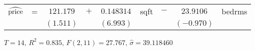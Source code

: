 \begin{tabular}{rcccc@{\,}lcc@{\,}l}
$\widehat{\rm price}$ & = &
$121.179$& $+$ & $0.148314$ & sqft & $-$ & $23.9106$ & bedrms \\
& & $(1.511)$ & & $(6.993)$ & & & $(-0.970)$ 
\end{tabular}

\vspace{8pt}
$T = 14,\, R^2 = 0.835,\, F(2,11) = 27.767,\, \hat{\sigma} = 39.118460$
